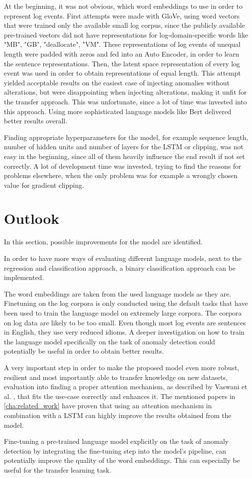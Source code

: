 At the beginning, it was not obvious, which word embeddings to use in order to represent log events. First attempts were made with GloVe, using word vectors that were trained only the available small log corpus, since the publicly available pre-trained vectors did not have representations for log-domain-specific words like "MB", "GB", "deallocate", "VM". These representations of log events of unequal length were padded with zeros and fed into an Auto Encoder, in order to learn the sentence representations. Then, the latent space representation of every log event was used in order to obtain representations of equal length. This attempt yielded acceptable results on the easiest case of injecting anomalies without alterations, but were disappointing when injecting alterations, making it unfit for the transfer approach. This was unfortunate, since a lot of time was invested into this approach. Using more sophisticated language models like Bert delivered better results overall.

Finding appropriate hyperparameters for the model, for example sequence length, number of hidden units and number of layers for the LSTM or clipping, was not easy in the beginning, since all of them heavily influence the end result if not set correctly. A lot of development time was invested, trying to find the reasons for problems elsewhere, when the only problem was for example a wrongly chosen value for gradient clipping.

\section{Outlook\label{sec:outlook}}
In this section, possible improvements for the model are identified. 

In order to have more ways of evaluating different language models, next to the regression and classification approach, a binary classification approach can be implemented.

The word embeddings are taken from the used language models as they are. Finetuning on the log corpora is only conducted using the default tasks that have been used to train the language model on extremely large corpora. The corpora on log data are likely to be too small. Even though most log events are sentences in English, they use very reduced idioms. A deeper investigation on how to train the language model specifically on the task of anomaly detection could potentially be useful in order to obtain better results.

A very important step in order to make the proposed model even more robust, resilient and most importantly able to transfer knowledge on new datasets, evaluation into finding a proper attention mechanism, as described by Vaswani et al. \cite{vaswani2017attention}, that fits the use-case correctly and enhances it. The mentioned papers in \ref{cha:related_work} have proven that using an attention mechanism in combination with a LSTM can highly improve the results obtained from the model.

Fine-tuning a pre-trained language model explicitly on the task of anomaly detection by integrating the fine-tuning step into the model's pipeline, can potentially improve the quality of the word embeddings. This can especially be useful for the transfer learning task.



